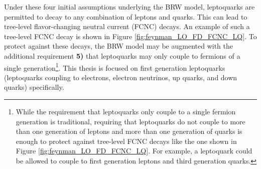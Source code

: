 Under these four initial assumptions underlying the BRW model, leptoquarks are permitted
to decay to any combination of leptons and quarks.  This can lead to
tree-level flavor-changing neutral current (FCNC) 
decays.  An example of such a tree-level FCNC decay is shown in Figure 
\ref{fig:feynman_LO_FD_FCNC_LQ}.  To protect against these decays, 
the BRW model may be augmented with the additional requirement {\bf 5)} that leptoquarks
may only couple to fermions of a single generation\footnote{While the requirement that 
leptoquarks only couple to a single fermion generation is traditional, requiring 
that leptoquarks do not couple to more than one generation of leptons and more
than one generation of quarks is enough to protect against tree-level 
FCNC decays like the one shown in Figure \ref{fig:feynman_LO_FD_FCNC_LQ}.
For example, a leptoquark could be allowed to couple to first generation
leptons and third generation quarks.}.
This thesis is focused on first generation leptoquarks (leptoquarks coupling to electrons,
electron neutrinos, up quarks, and down quarks) specifically.
